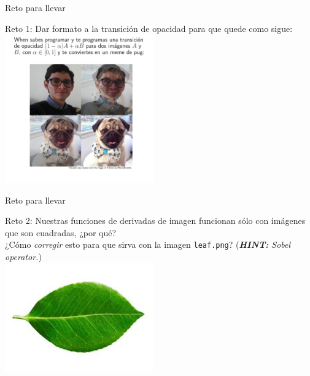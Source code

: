 \documentclass[usenames,dvipsnames]{beamer}
\begin{document}
  \begin{frame}{Reto para llevar}
    \vspace*{0.5cm}
    \begin{block}{Reto 1:}
      Dar formato a la transición de opacidad para que quede como sigue:\\
      \centering
      \includegraphics[width=0.48\textwidth]{imgs/meme}
      \vspace*{0.5cm}
    \end{block}
  \end{frame}

  \begin{frame}{Reto para llevar}
    \vspace*{0.5cm}
    \begin{block}{Reto 2:}
      Nuestras funciones de derivadas de imagen funcionan sólo con imágenes
      que son cuadradas, ¿por qué?\\
      \vspace*{0.5cm}
      ¿Cómo {\color{orange} \textit{corregir}} esto para que sirva con la imagen
      \texttt{leaf.png}? (\textit{\textbf{HINT:} Sobel operator.})\\
      \centering
      \includegraphics[width=0.48\textwidth]{../imgs/leaf}
      \vspace*{0.5cm}
    \end{block}
  \end{frame}
\end{document}
